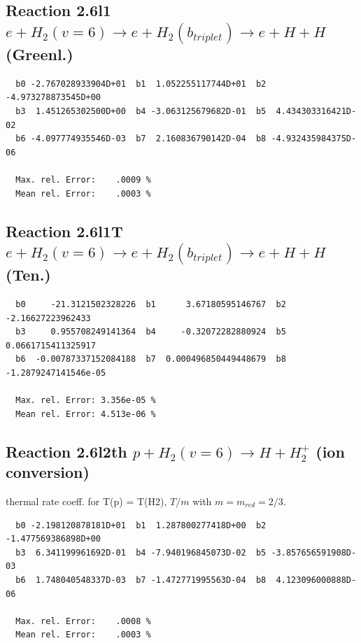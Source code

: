 \documentclass[12pt,dvipdfmx]{article}
\begin{document}
\newpage
\subsection{
Reaction 2.6l1
$ e + H_2(v=6) \rightarrow e +  H_2(b_{triplet}) \rightarrow e + H + H $ (Greenl.)
}


\begin{small}\begin{verbatim}
  b0 -2.767028933904D+01  b1  1.052255117744D+01  b2 -4.973278873545D+00
  b3  1.451265302500D+00  b4 -3.063125679682D-01  b5  4.434303316421D-02
  b6 -4.097774935546D-03  b7  2.160836790142D-04  b8 -4.932435984375D-06

  Max. rel. Error:    .0009 %
  Mean rel. Error:    .0003 %

\end{verbatim}\end{small}


\subsection{
Reaction 2.6l1T
$  e + H_2(v=6) \rightarrow e +  H_2(b_{triplet}) \rightarrow e + H + H $ (Ten.)
}


\begin{small}\begin{verbatim}
  b0     -21.3121502328226  b1      3.67180595146767  b2     -2.16627223962433
  b3     0.955708249141364  b4     -0.32072282880924  b5    0.0661715411325917
  b6  -0.00787337152084188  b7  0.000496850449448679  b8  -1.2879247141546e-05

  Max. rel. Error: 3.356e-05 %
  Mean rel. Error: 4.513e-06 %
\end{verbatim}\end{small}


\subsection{
Reaction 2.6l2th
$ p + H_2(v=6) \rightarrow H + H_2^+$ (ion conversion)
}
thermal rate coeff. for T(p) = T(H2),
$T/m$ with $m=m_{red}=2/3$.

\begin{small}\begin{verbatim}
  b0 -2.198120878181D+01  b1  1.287800277418D+00  b2 -1.477569386898D+00
  b3  6.341199961692D-01  b4 -7.940196845073D-02  b5 -3.857656591908D-03
  b6  1.748040548337D-03  b7 -1.472771995563D-04  b8  4.123096000888D-06

  Max. rel. Error:    .0008 %
  Mean rel. Error:    .0003 %
\end{verbatim}\end{small}
\end{document}

